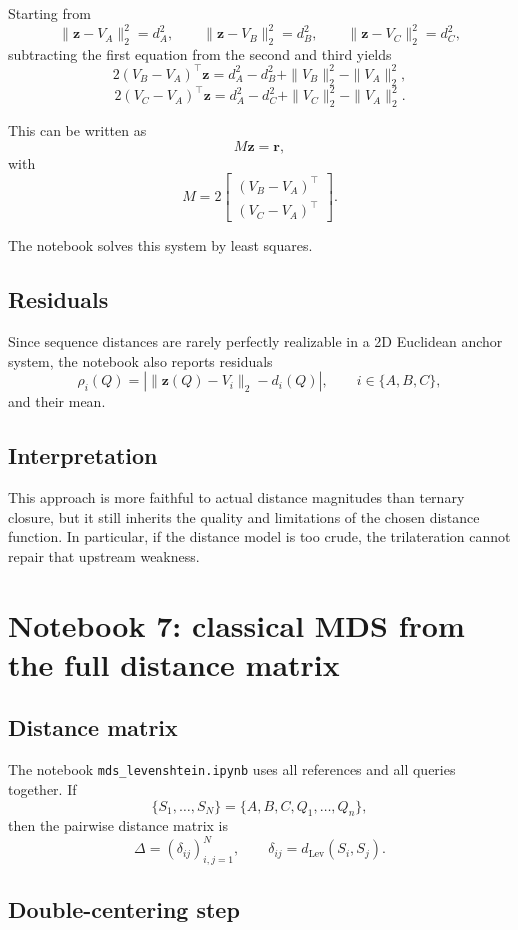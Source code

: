 \documentclass[11pt,a4paper]{article}
\begin{document}
Starting from
\[
\|\bm{z}-V_A\|_2^2=d_A^2,\qquad
\|\bm{z}-V_B\|_2^2=d_B^2,\qquad
\|\bm{z}-V_C\|_2^2=d_C^2,
\]
subtracting the first equation from the second and third yields
\[
2(V_B-V_A)^\top \bm{z}
=d_A^2-d_B^2+\|V_B\|_2^2-\|V_A\|_2^2,
\]
\[
2(V_C-V_A)^\top \bm{z}
=d_A^2-d_C^2+\|V_C\|_2^2-\|V_A\|_2^2.
\]

This can be written as
\[
M\bm{z}=\bm{r},
\]
with
\[
M=
2\begin{bmatrix}
(V_B-V_A)^\top \\
(V_C-V_A)^\top
\end{bmatrix}.
\]

The notebook solves this system by least squares.

\subsection{Residuals}

Since sequence distances are rarely perfectly realizable in a 2D Euclidean anchor system, the notebook also reports residuals
\[
\rho_i(Q)=\left|\|\bm{z}(Q)-V_i\|_2-d_i(Q)\right|,
\qquad i\in\{A,B,C\},
\]
and their mean.

\subsection{Interpretation}

This approach is more faithful to actual distance magnitudes than ternary closure, but it still inherits the quality and limitations of the chosen distance function. In particular, if the distance model is too crude, the trilateration cannot repair that upstream weakness.

\section{Notebook 7: classical MDS from the full distance matrix}

\subsection{Distance matrix}

The notebook \texttt{mds\_levenshtein.ipynb} uses all references and all queries together. If
\[
\{S_1,\dots,S_N\}=\{A,B,C,Q_1,\dots,Q_n\},
\]
then the pairwise distance matrix is
\[
\Delta=(\delta_{ij})_{i,j=1}^{N},
\qquad
\delta_{ij}=d_{\mathrm{Lev}}(S_i,S_j).
\]

\subsection{Double-centering step}
\end{document}
